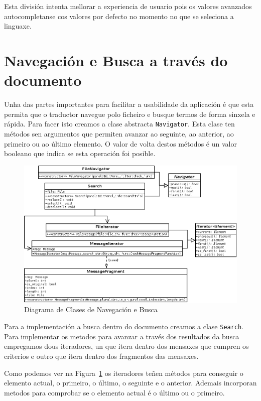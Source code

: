 Esta división intenta mellorar a experiencia de usuario pois os valores avanzados autocompletanse cos valores por defecto no momento no que se seleciona a linguaxe.

\section{Navegación e Busca a través do documento}

Unha das partes importantes para facilitar a usabilidade da aplicación é que esta permita que o traductor navegue polo ficheiro e busque termos de forma sinxela e rápida. Para facer isto creamos a clase abstracta \lstinline{Navigator}. Esta clase ten métodos sen argumentos que permiten avanzar ao seguinte, ao anterior, ao primeiro ou ao último elemento. O valor de volta destos métodos é un valor booleano que indica se esta operación foi posible.

\begin{figure}[h!]
  \centering
  \includegraphics[width=\textwidth]{img/navigator_diagram.png}
  \caption{Diagrama de Clases de Navegación e Busca}
  \label{fig:nav:diagram}
\end{figure}

Para a implementación a busca dentro do documento creamos a clase \lstinline{Search}. Para implementar os metodos para avanzar a través dos resultados da busca empregamos dous iteradores, un que itera dentro dos mensaxes que cumpren os criterios e outro que itera dentro dos fragmentos das mensaxes.

Como podemos ver na Figura~\ref{fig:nav:diagram} os iteradores teñen métodos para conseguir o elemento actual, o primeiro, o último, o seguinte e o anterior. Ademais incorporan metodos para comprobar se o elemento actual é o último ou o primeiro.


